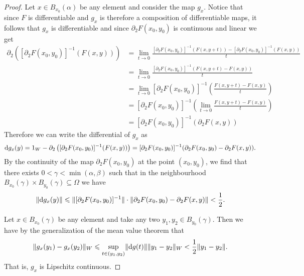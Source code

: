 \begin{proof}
    Let \(x \in B_{x_0}(\alpha)\) be any element and consider the map \(g_x\). Notice
    that since \(F\) is differentiable and \(g_{x}\) is therefore a composition of
    differentiable maps, it follows that \(g_x\) is differentiable and since \(\partial_2
    F(x_0, y_0)\) is continuous and linear we get
        {\small%
            \begin{align*}
                \partial_2 \left( [\partial_2F(x_0, y_0)]^{-1}(F(x, y)) \right)
                 & = \lim_{t \to 0} \frac{[\partial_{2}F(x_0, y_0)]^{-1}(F(x, y + t)) - [\partial_2F(x_0,
                y_0)]^{-1}(F(x, y))}{t}
                \\
                 & = \lim_{t \to 0} \frac{[\partial_2F(x_0, y_{0})]^{-1}(F(x, y + t) - F(x, y))}{t}
                \\
                 & = \lim_{t \to 0} [\partial_2F(x_0, y_0)]^{-1}
                \left( \frac{F(x, y + t) - F(x, y)}{t} \right)
                \\
                 & = [\partial_2F(x_0, y_0)]^{-1}
                \left( \lim_{t \to 0} \frac{F(x, y + t) - F(x, y)}{t} \right)
                \\
                 & = [\partial_{2}F(x_0, y_0)]^{-1}(\partial_2 F(x, y))
            \end{align*}
        }%
    Therefore we can write the differential of \(g_{x}\) as
    \[
        \mathrm{d} g_x(y) = 1_W - \partial_{2}\left([\partial_2F(x_0, y_0)]^{-1}(F(x, y))\right)
        = [\partial_2F(x_0, y_0)]^{-1}(\partial_2F(x_0, y_0) - \partial_2F(x, y)).
    \]
    By the continuity of the map \(\partial_2F(x_0, y_0)\) at the point \((x_0, y_0)\),
    we find that there exists \(0 < \gamma < \min(\alpha, \beta)\) such that in the neighbourhood
    \(B_{x_0}(\gamma) \times B_{y_0}(\gamma) \subseteq \Omega\) we have
    \[
        \lVert\mathrm{d} g_x(y)\rVert \leqslant \lVert[\partial_{2}F(x_0, y_0)]^{-1}\rVert \cdot \lVert\partial_2F(x_0, y_0) -
            \partial_2F(x, y)\rVert < \frac{1}{2}.
    \]

    Let \(x \in B_{x_0}(\gamma)\) be any element and take any two \(y_1, y_2 \in
    B_{y_0}(\gamma)\). Then we have by the generalization of the mean value theorem
    that
    \[
        \lVert g_x(y_1) - g_x(y_{2})\rVert_{W} \leqslant \sup_{t \in (y_1, y_2)} \lVert\mathrm{d} g(t)\rVert
        \lVert y_1 - y_2\rVert_W < \frac{1}{2} \lVert y_1 - y_2\rVert.
    \]
    That is, \(g_x\) is Lipschitz continuous.


\end{proof}

